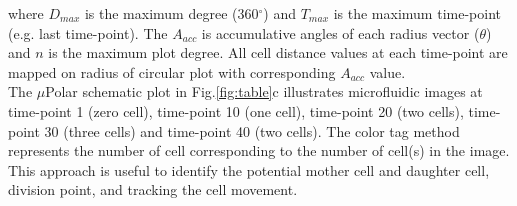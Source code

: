 \documentclass[conference]{IEEEtran}
\begin{document}
where $ D_{max} $ is the maximum degree (360$^{\circ}$) and  $ T_{max} $ is the maximum time-point (e.g. last time-point). The  $ A_{acc} $ is accumulative angles of each radius vector ($\theta$) and $ n $ is the maximum plot degree. All cell distance values at each time-point are mapped on radius of circular plot with corresponding $A_{acc}$ value.
\\
The $\mu$Polar schematic plot in Fig.\ref{fig:table}c illustrates microfluidic images at time-point 1 (zero cell), time-point 10 (one cell), time-point 20 (two cells), time-point 30 (three cells) and time-point 40 (two cells). The color tag method represents the number of cell corresponding to the number of cell(s) in the image. This approach is useful to identify the potential mother cell and daughter cell, division point, and tracking the cell movement. 



 
 
 
 
 
\end{document}
